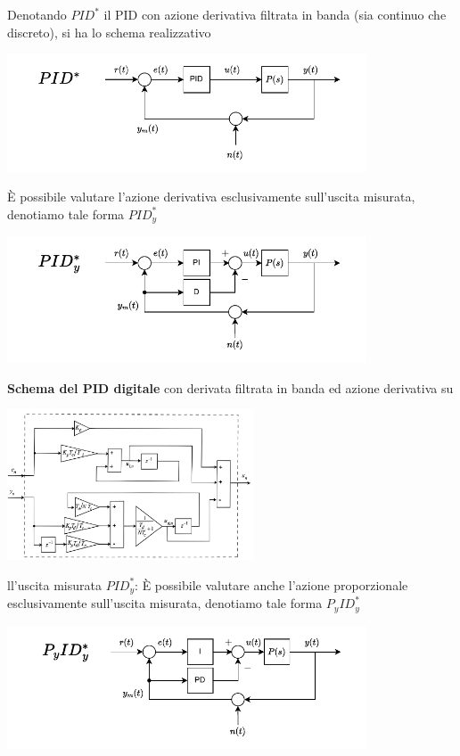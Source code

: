 \documentclass[10pt, letterpaper]{report}
\begin{document}
Denotando $PID^*$ il PID con azione derivativa filtrata in banda (sia continuo che discreto), si ha lo schema realizzativo
\begin{center}
    \includegraphics[width=0.8\textwidth]{images/schemaDiControlloPID.pdf}
\end{center}
È possibile valutare l'azione derivativa esclusivamente sull'uscita misurata, denotiamo tale forma $PID_y^*$
\begin{center}
    \includegraphics[width=0.8\textwidth]{images/schemaPIDderivataUscita.pdf}
\end{center}
\textbf{Schema del PID digitale} con derivata filtrata in banda ed azione derivativa su\begin{center}
    \includegraphics[width=0.55\textwidth]{images/schemaPidDigSuUscita.pdf}
\end{center}ll'uscita misurata $PID_y^*$:
È possibile valutare anche l'azione proporzionale esclusivamente sull'uscita misurata, denotiamo tale forma $P_yID_y^*$
\begin{center}
    \includegraphics[width=0.8\textwidth]{images/schemaPIDderivataPropUscita.pdf}
\end{center}
\end{document}
